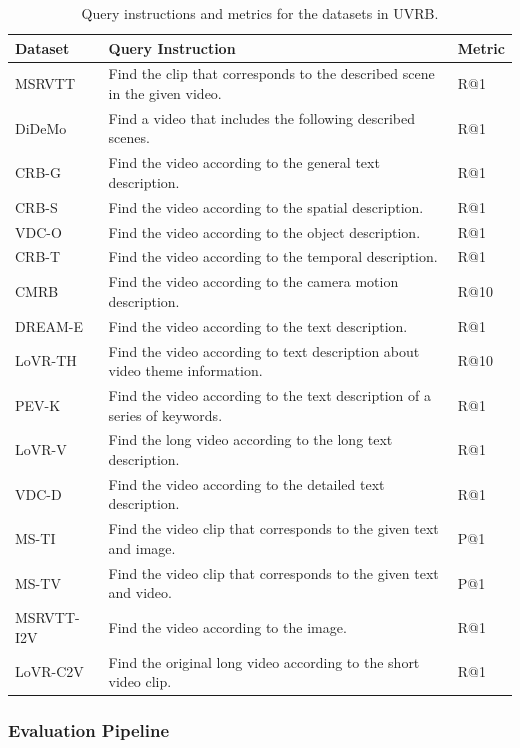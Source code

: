 \begin{table}[t]
\centering
\caption{Query instructions and metrics for the datasets in UVRB.}
\label{gve:tab:uvrb_prompts_metric}
\begin{tabular}{l p{10cm} l}
\toprule
\textbf{Dataset} & \textbf{Query Instruction} & \textbf{Metric} \\
\midrule
MSRVTT & Find the clip that corresponds to the described scene in the given video. & R@1 \\
DiDeMo & Find a video that includes the following described scenes. & R@1 \\
CRB-G & Find the video according to the general text description. & R@1 \\
CRB-S & Find the video according to the spatial description. & R@1 \\
VDC-O & Find the video according to the object description. & R@1 \\
CRB-T & Find the video according to the temporal description. & R@1 \\
CMRB & Find the video according to the camera motion description. & R@10 \\
DREAM-E & Find the video according to the text description. & R@1 \\
LoVR-TH & Find the video according to text description about video theme information. & R@10 \\
PEV-K & Find the video according to the text description of a series of keywords. & R@1 \\
LoVR-V & Find the long video according to the long text description. & R@1 \\
VDC-D & Find the video according to the detailed text description. & R@1 \\
MS-TI & Find the video clip that corresponds to the given text and image. & P@1 \\
MS-TV & Find the video clip that corresponds to the given text and video. & P@1 \\
MSRVTT-I2V & Find the video according to the image. & R@1 \\
LoVR-C2V & Find the original long video according to the short video clip. & R@1 \\
\bottomrule
\end{tabular}
\end{table}

\subsubsection{Evaluation Pipeline}

